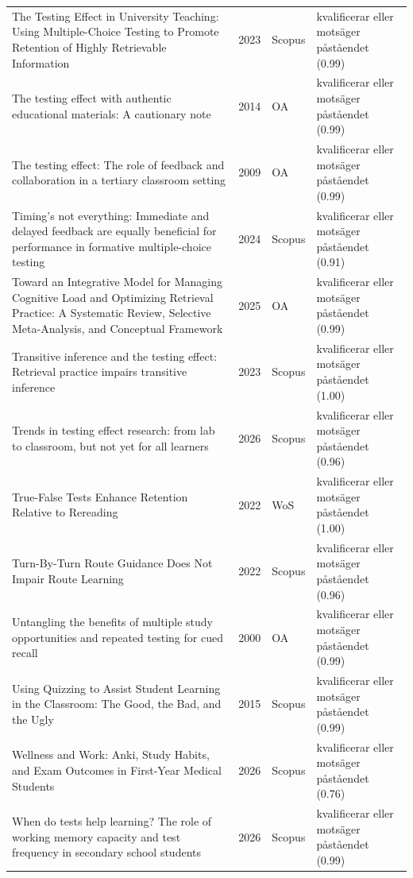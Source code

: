 \begin{longtable}{@{}%
  >{\raggedright\arraybackslash}p{}c%
  >{\raggedright\arraybackslash}p{}%
  >{\raggedright\arraybackslash}p{}@{}}
The Testing Effect in University Teaching: Using Multiple-Choice Testing to Promote Retention of Highly Retrievable Information & 2023 & Scopus & kvalificerar eller motsäger påståendet (0.99) \\
The testing effect with authentic educational materials: A cautionary note & 2014 & OA & kvalificerar eller motsäger påståendet (0.99) \\
The testing effect: The role of feedback and collaboration in a tertiary classroom setting & 2009 & OA & kvalificerar eller motsäger påståendet (0.99) \\
Timing's not everything: Immediate and delayed feedback are equally beneficial for performance in formative multiple-choice testing & 2024 & Scopus & kvalificerar eller motsäger påståendet (0.91) \\
Toward an Integrative Model for Managing Cognitive Load and Optimizing Retrieval Practice: A Systematic Review, Selective Meta-Analysis, and Conceptual Framework & 2025 & OA & kvalificerar eller motsäger påståendet (0.99) \\
Transitive inference and the testing effect: Retrieval practice impairs transitive inference & 2023 & Scopus & kvalificerar eller motsäger påståendet (1.00) \\
Trends in testing effect research: from lab to classroom, but not yet for all learners & 2026 & Scopus & kvalificerar eller motsäger påståendet (0.96) \\
True-False Tests Enhance Retention Relative to Rereading & 2022 & WoS & kvalificerar eller motsäger påståendet (1.00) \\
Turn-By-Turn Route Guidance Does Not Impair Route Learning & 2022 & Scopus & kvalificerar eller motsäger påståendet (0.96) \\
Untangling the benefits of multiple study opportunities and repeated testing for cued recall & 2000 & OA & kvalificerar eller motsäger påståendet (0.99) \\
Using Quizzing to Assist Student Learning in the Classroom: The Good, the Bad, and the Ugly & 2015 & Scopus & kvalificerar eller motsäger påståendet (0.99) \\
Wellness and Work: Anki, Study Habits, and Exam Outcomes in First-Year Medical Students & 2026 & Scopus & kvalificerar eller motsäger påståendet (0.76) \\
When do tests help learning? The role of working memory capacity and test frequency in secondary school students & 2026 & Scopus & kvalificerar eller motsäger påståendet (0.99) \\

\end{longtable}
